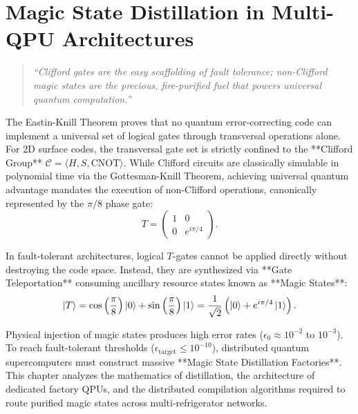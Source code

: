 \chapter{Magic State Distillation in Multi-QPU Architectures}
\label{ch:magic_state_distillation}

\begin{quote}
\textit{``Clifford gates are the easy scaffolding of fault tolerance; non-Clifford magic states are the precious, fire-purified fuel that powers universal quantum computation.''}
\end{quote}

The Eastin-Knill Theorem proves that no quantum error-correcting code can implement a universal set of logical gates through transversal operations alone. For 2D surface codes, the transversal gate set is strictly confined to the **Clifford Group** $\mathcal{C} = \langle H, S, \text{CNOT} \rangle$. While Clifford circuits are classically simulable in polynomial time via the Gottesman-Knill Theorem, achieving universal quantum advantage mandates the execution of non-Clifford operations, canonically represented by the $\pi/8$ phase gate:
\begin{equation}
    T = \begin{pmatrix} 1 & 0 \\ 0 & e^{i\pi/4} \end{pmatrix}.
    \label{eq:t_gate_matrix}
\end{equation}

In fault-tolerant architectures, logical $T$-gates cannot be applied directly without destroying the code space. Instead, they are synthesized via **Gate Teleportation** consuming ancillary resource states known as **Magic States**:
\begin{equation}
    \ket{T} = \cos\left(\frac{\pi}{8}\right) \ket{0} + \sin\left(\frac{\pi}{8}\right) \ket{1} = \frac{1}{\sqrt{2}} \left( \ket{0} + e^{i\pi/4} \ket{1} \right).
    \label{eq:magic_state_definition}
\end{equation}

Physical injection of magic states produces high error rates ($\epsilon_0 \approx 10^{-2}$ to $10^{-3}$). To reach fault-tolerant thresholds ($\epsilon_{\text{target}} \le 10^{-10}$), distributed quantum supercomputers must construct massive **Magic State Distillation Factories**. This chapter analyzes the mathematics of distillation, the architecture of dedicated factory QPUs, and the distributed compilation algorithms required to route purified magic states across multi-refrigerator networks.

